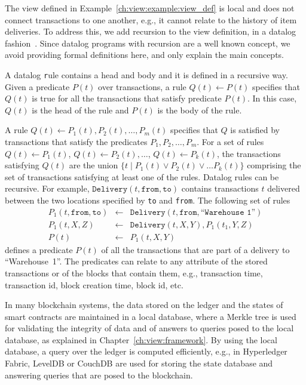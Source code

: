 The view defined in Example~\ref{ch:view:example:view_def} is local and does not connect transactions to one another, e.g., it cannot relate to the history of item deliveries. To address this, we add recursion to the view definition, in a datalog fashion~\cite{abiteboul1995foundations}. Since datalog programs with recursion are a well known concept, we avoid providing formal definitions here, and only explain the main concepts. 

A datalog {\texttt rule\/} contains a head and body and it is defined in a recursive way. Given a predicate $P(t)$ over transactions, a rule $Q(t) \gets P(t)$ specifies that $Q(t)$ is true for all the transactions that satisfy predicate $P(t)$. In this case, $Q(t)$ is the head of the rule and $P(t)$ is the body of the rule. 

A rule $Q(t)\gets P_1(t), P_2(t), \ldots, P_m(t)$ specifies that $Q$ is satisfied by transactions that satisfy  the predicates $P_1, P_2,\ldots, P_m$. For a set of rules $Q(t)\gets P_1(t)$, $Q(t)\gets P_2(t), \ldots$, $Q(t)\gets P_k(t)$, the transactions satisfying $Q(t)$ are the union $\{ t \mid P_1(t) \vee P_2(t)\vee\ldots P_k(t)\}$ comprising the set of transactions satisfying at least one of the rules. Datalog rules can be recursive. For example, $\texttt{Delivery}(t, \texttt{from}, \texttt{to})$ contains transactions $t$ delivered between the two locations specified by \texttt{to} and \texttt{from}. The following set of rules 
\begin{eqnarray*}
P_1(t, \texttt{from}, \texttt{to}) & \gets & \texttt{Delivery}(t, \texttt{from}, \texttt{``Warehouse 1''}) \\
P_1(t, X, Z) & \gets & \texttt{Delivery}(t, X, Y),  P_1(t_1, Y, Z) \\
P(t) & \gets & P_1(t, X, Y)
\end{eqnarray*}
defines a predicate $P(t)$ of all the transactions that are part of a delivery to ``Warehouse~1''.
%
The predicates can relate to any attribute of the stored transactions or of the blocks that contain them, e.g., transaction time, transaction id, block creation time, block id, etc. 

In many blockchain systems, the data stored on the ledger and the states of smart contracts are maintained in a local database, where a Merkle tree is used for validating the integrity of data and of answers to queries posed to the local database, as explained in Chapter~\ref{ch:view:framework}. By using the local database, a query over the ledger is computed efficiently, e.g., in Hyperledger Fabric, LevelDB or CouchDB are used for storing the state database and answering queries that are posed to the blockchain.


